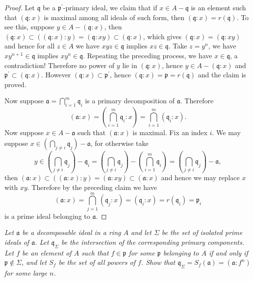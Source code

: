 \begin{proof}
Let $\mathfrak{q}$ be a $\mathfrak{p}^\prime$-primary ideal, we claim that if $x\in A-\mathfrak{q}$ is an element such that $(\mathfrak{q}:x)$ is maximal among all ideals of such form, then $(\mathfrak{q}:x)=r(\mathfrak{q})$. To see this, suppose $y\in A-(\mathfrak{q}:x)$, then $\left( \mathfrak{q} :x \right) \subset \left( \left( \mathfrak{q} :x \right) :y \right) =\left( \mathfrak{q} :xy \right) \subset \left( \mathfrak{q} :x \right) $, which gives $(\mathfrak{q}:x)=(\mathfrak{q}:xy)$ and hence for all $z\in A$ we have $xyz\in\mathfrak{q}$ implies $xz\in\mathfrak{q}$. Take $z=y^n$, we have $xy^{n+1}\in\mathfrak{q}$ implies $xy^n\in\mathfrak{q}$. Repeating the preceding process, we have $x\in\mathfrak{q}$, a contradiction! Therefore no power of $y$ lie in $(\mathfrak{q}:x)$, hence $y\in A-(\mathfrak{q}:x)$ and $\mathfrak{p}^\prime\subset(\mathfrak{q}:x)$. However $(\mathfrak{q}:x)\subset\mathfrak{p}^\prime$, hence $(\mathfrak{q}:x)=\mathfrak{p}=r(\mathfrak{q})$ and the claim is proved.\par
Now suppose $\mathfrak{a}=\bigcap_{i=1}^m\mathfrak{q}_i$ is a primary decomposition of $\mathfrak{a}$. Therefore 
$$
\left( \mathfrak{a} :x \right) =\left( \bigcap_{i=1}^m{\mathfrak{q} _i}:x \right) =\bigcap_{i=1}^m{\left( \mathfrak{q} _i:x \right)}.
$$
Now suppose $x\in A-\mathfrak{a}$ such that $(\mathfrak{a}:x)$ is maximal. Fix an index $i$. We may suppose $x\in\left( \bigcap_{j\ne i}{\mathfrak{q} _j} \right) -\mathfrak{a} $, for otherwise take 
$$
y\in \left( \bigcap_{j\ne i}{\mathfrak{q} _j} \right) -\mathfrak{q} _i=\left( \bigcap_{j\ne i}{\mathfrak{q} _j} \right) -\left( \bigcap_{i=1}^m{\mathfrak{q} _i} \right) =\left( \bigcap_{j\ne i}{\mathfrak{q} _j} \right) -\mathfrak{a} ,
$$
then $\left( \mathfrak{a} :x \right) \subset \left( \left( \mathfrak{a} :x \right) :y \right) =\left( \mathfrak{a} :xy \right) \subset \left( \mathfrak{a} :x \right) $ and hence we may replace $x$ with $xy$. Therefore by the preceding claim we have 
$$
\left( \mathfrak{a} :x \right) =\bigcap_{j=1}^m{\left( \mathfrak{q} _j:x \right)}=\left( \mathfrak{q} _i:x \right) =r\left( \mathfrak{q} _i \right) =\mathfrak{p} _i
$$
is a prime ideal belonging to $\mathfrak{a}$.
\end{proof}
\begin{problem}\em
Let $\mathfrak{a}$ be a decomposable ideal in a ring $A$ and let $\Sigma$ be the set of isolated prime ideals of $\mathfrak{a}$. Let $\mathfrak{q}_\Sigma$ be the intersection of the corresponding primary components. Let $f$ be an element of $A$ such that $f\in\mathfrak{p}$ for some $\mathfrak{p}$ belonging to $A$ if and only if $\mathfrak{p}\notin\Sigma$, and let $S_f$ be the set of all powers of $f$. Show that $\mathfrak{q}_\Sigma=S_f(\mathfrak{a})=(\mathfrak{a}:f^n)$ for some large $n$.
\end{problem}
